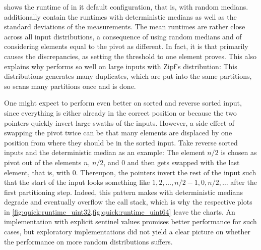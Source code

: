  shows the runtime of \QS{} in it default configuration, that is, with random medians.
 additionally contain the runtimes with deterministic medians as well as the standard deviations of the measurements.
The mean runtimes are rather close across all input distributions, a consequence of using random medians and of considering elements equal to the pivot as different.
In fact, it is \IS{} that primarily causes the discrepancies, as setting the threshold to one element proves.
This also explains why \QS{} performs so well on large inputs with Zipf's distribution:
This distributions generates many duplicates, which are put into the same partitions, so \IS{} scans many partitions once and is done.

One might expect \QS{} to perform even better on sorted and reverse sorted input, since everything is either already in the correct position or because the two pointers quickly invert large swaths of the inputs.
However, a side effect of swapping the pivot twice can be that many elements are displaced by one position from where they should be in the sorted input.
Take reverse sorted inputs and the deterministic median as an example:
The element \(n/2\) is chosen as pivot out of the elements \(n\), \(n/2\), and \(0\) and then gets swapped with the last element, that is, with \(0\).
Thereupon, the pointers invert the rest of the input such that the start of the input looks something like \(1, 2, \dots, n/2-1, 0, n/2, \dots\) after the first partitioning step.
Indeed, this pattern makes \QS{} with deterministic medians degrade and eventually overflow the call stack, which is why the respective plots in \cref{fig:quick:runtime_uint32,fig:quick:runtime_uint64} leave the charts.
An implementation with explicit sentinel values promises better performance for such cases, but exploratory implementations did not yield a clear picture on whether the performance on more random distributions suffers.

